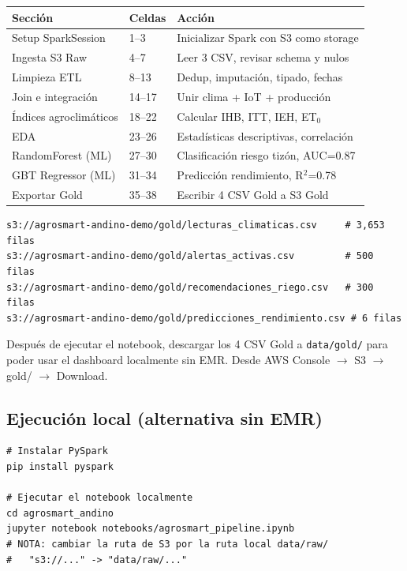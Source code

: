 \documentclass[11pt,a4paper]{article}
\begin{document}
\begin{tabular}{lll}
\toprule
Secci\'on & Celdas & Acci\'on \\
\midrule
Setup SparkSession & 1--3 & Inicializar Spark con S3 como storage \\
Ingesta S3 Raw & 4--7 & Leer 3 CSV, revisar schema y nulos \\
Limpieza ETL & 8--13 & Dedup, imputaci\'on, tipado, fechas \\
Join e integraci\'on & 14--17 & Unir clima + IoT + producci\'on \\
\'Indices agroclim\'aticos & 18--22 & Calcular IHB, ITT, IEH, ET$_0$ \\
EDA & 23--26 & Estad\'isticas descriptivas, correlaci\'on \\
RandomForest (ML) & 27--30 & Clasificaci\'on riesgo tiz\'on, AUC=0.87 \\
GBT Regressor (ML) & 31--34 & Predicci\'on rendimiento, R$^2$=0.78 \\
Exportar Gold & 35--38 & Escribir 4 CSV Gold a S3 Gold \\
\bottomrule
\end{tabular}

\begin{okbox}
\begin{lstlisting}
s3://agrosmart-andino-demo/gold/lecturas_climaticas.csv     # 3,653 filas
s3://agrosmart-andino-demo/gold/alertas_activas.csv         # 500 filas
s3://agrosmart-andino-demo/gold/recomendaciones_riego.csv   # 300 filas
s3://agrosmart-andino-demo/gold/predicciones_rendimiento.csv # 6 filas
\end{lstlisting}
\end{okbox}

\begin{alertbox}
Despu\'es de ejecutar el notebook, descargar los 4 CSV Gold a
\texttt{data/gold/} para poder usar el dashboard localmente sin EMR.
Desde AWS Console $\to$ S3 $\to$ gold/ $\to$ Download.
\end{alertbox}

\subsection{Ejecuci\'on local (alternativa sin EMR)}

\begin{localbox}
\begin{lstlisting}[style=bash]
# Instalar PySpark
pip install pyspark

# Ejecutar el notebook localmente
cd agrosmart_andino
jupyter notebook notebooks/agrosmart_pipeline.ipynb
# NOTA: cambiar la ruta de S3 por la ruta local data/raw/
#   "s3://..." -> "data/raw/..."
\end{lstlisting}
\end{localbox}
\end{document}
